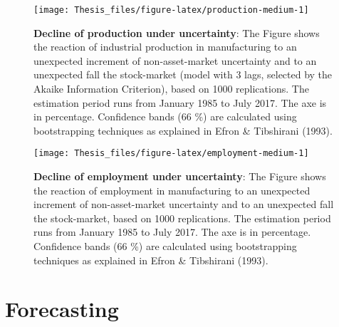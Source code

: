 \documentclass[12pt,twoside]{reedthesis}
\begin{document}
\begin{figure}

{\centering \texttt{[image: Thesis\_files/figure-latex/production-medium-1]} 

}

\caption[Decline of production under uncertainty]{\textbf{Decline of production under uncertainty}: The Figure shows the reaction of industrial production in manufacturing to an unexpected increment of non-asset-market uncertainty and to an unexpected fall the stock-market (model with 3 lags, selected by the Akaike Information Criterion), based on 1000 replications. The estimation period runs from January 1985 to July 2017. The axe is in percentage. Confidence bands (66 \%) are calculated using bootstrapping techniques as explained in Efron \& Tibshirani (1993).}\label{fig:production-medium}
\end{figure}

\begin{figure}

{\centering \texttt{[image: Thesis\_files/figure-latex/employment-medium-1]} 

}

\caption[Decline of employment under uncertainty]{\textbf{Decline of employment under uncertainty}: The Figure shows the reaction of employment in manufacturing to an unexpected increment of non-asset-market uncertainty and to an unexpected fall the stock-market, based on 1000 replications. The estimation period runs from January 1985 to July 2017. The axe is in percentage. Confidence bands (66 \%) are calculated using bootstrapping techniques as explained in Efron \& Tibshirani (1993).}\label{fig:employment-medium}
\end{figure}
\hypertarget{forecasting}{%
\section{Forecasting}\label{forecasting}}
\end{document}
